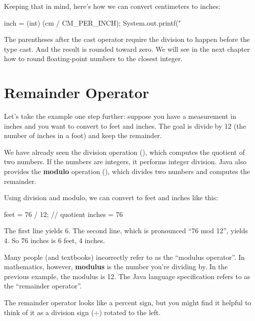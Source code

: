 
Keeping that in mind, here's how we can convert centimeters to inches:

\begin{code}
inch = (int) (cm / CM_PER_INCH);
System.out.printf("%
\end{code}

The parentheses after the cast operator require the division to happen before the type cast.
And the result is rounded toward zero.
We will see in the next chapter how to round floating-point numbers to the closest integer.


\section{Remainder Operator}

Let's take the example one step further: suppose you have a measurement in inches and you want to convert to feet and inches.
The goal is divide by 12 (the number of inches in a foot) and keep the remainder.


We have already seen the division operation (\java{/}), which computes the quotient of two numbers.
If the numbers are integers, it performs integer division.
Java also provides the {\bf modulo} operation (\java{\%}), which divides two numbers and computes the remainder.

Using division and modulo, we can convert to feet and inches like this:

\begin{code}
feet = 76 / 12;    // quotient
inches = 76 %
\end{code}

The first line yields 6.
The second line, which is pronounced ``76 mod 12'', yields 4.
So 76 inches is 6 feet, 4 inches.


Many people (and textbooks) incorrectly refer to \java{\%} as the ``modulus operator''.
In mathematics, however, {\bf modulus} is the number you're dividing by.
In the previous example, the modulus is 12.
The Java language specification refers to  \java{\%} as the ``remainder operator''.

The remainder operator looks like a percent sign, but you might find it helpful to think of it as a division sign ($\div$) rotated to the left.

